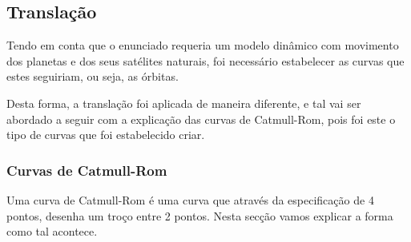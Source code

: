 \documentclass[a4paper]{article}
\begin{document}
\subsection{Translação}
\label{sec:translacao}

Tendo em conta que o enunciado requeria um modelo dinâmico com movimento dos planetas e dos seus satélites naturais, foi necessário estabelecer as curvas que estes seguiriam, ou seja, as órbitas.

Desta forma, a translação foi aplicada de maneira diferente, e tal vai ser abordado a seguir com a explicação das curvas de Catmull-Rom, pois foi este o tipo de curvas que foi estabelecido criar.

\subsubsection{Curvas de Catmull-Rom}
\label{sec:catmullrom}

Uma curva de Catmull-Rom é uma curva que através da especificação de 4 pontos, desenha um troço entre 2 pontos. Nesta secção vamos explicar a forma como tal acontece.
\end{document}
